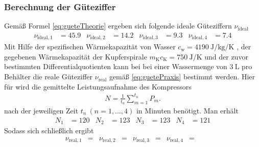 \subsubsection[]{Berechnung der Güteziffer}
Gemäß Formel \eqref{eq:gueteTheorie} ergeben sich folgende ideale Güteziffern $\nu_\text{ideal}$
\begin{align*}
    \nu_{\text{ideal}, 1} &= 45.9 & \nu_{\text{ideal}, 2} &=14.2 & \nu_{\text{ideal}, 3} &= 9.3 & \nu_{\text{ideal}, 4} &= 7.4
\end{align*}
Mit Hilfe der spezifischen Wärmekapazität von Wasser $c_{\text{w}} = \qty{4190}{\joule\per\kg\per\kelvin}$ \cite[]{leifi}, der gegebenen Wärmekapazität
der Kupferspirale $m_{\text{K}} c_{\text{K}} = \qty{750}{\joule\per\kelvin}$ und der zuvor bestimmten Differentialquotienten
kann bei bei einer Wassermenge von $\qty[]{3}{\liter}$ pro Behälter die reale Güteziffer $\nu_{\text{real}}$ gemäß \eqref{eq:guetePraxis} bestimmt werden.
Hier für wird die gemittelte Leistungsaufnahme des Kompressors
\begin{align*}
    N = \frac{1}{t_n} \sum_{m=1}^{t_n} P_m.
\end{align*}
nach der jeweiligen Zeit $t_n \ \left(n = 1, \dotsc, 4\right)$ in Minuten benötigt.
Man erhält
\begin{align*}
    N_1  &=  120 &
    N_2  &=  123 &
    N_3  &=  123 &
    N_4  &=  121
\end{align*}
Sodass sich schließlich ergibt
\begin{align*}
    \nu_{\text{real}, 1} &=  & \nu_{\text{real}, 2} &=  & \nu_{\text{real}, 3} &=  & \nu_{\text{real}, 4} &=  & 
\end{align*}
%
